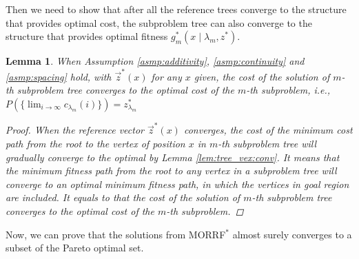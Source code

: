 \documentclass[conference]{IEEEtran}
\newtheorem{lem}{Lemma}
\begin{document}
Then we need to show that after all the reference trees converge to the structure that provides optimal cost, 
the subproblem tree can also converge to the structure that provides optimal fitness $ g^{*}_{m} ( x \mid \lambda_{m} , z^{*} ) $.
\begin{lem}
\label{lem:sub_tree:conv}
When Assumption \ref{asmp:additivity}, \ref{asmp:continuity} and \ref{asmp:spacing} hold,
with $ \vec{z}^{*} (x) $ for any $ x $ given,
the cost of the solution of $ m $-th subproblem tree converges to the optimal cost of the $ m $-th subproblem, i.e.,
$
P( \{ \lim_{ i \rightarrow \infty } c_{ \lambda_{m} }( i ) \} ) = z^{*}_{ \lambda_{m} }
$
\begin{proof}
When the reference vector $ \vec{z}^{*}(x) $ converges, the cost of the minimum cost path from the root to the vertex of position $ x $ in $ m $-th subproblem tree will gradually converge to the optimal by Lemma \ref{lem:tree_vex:conv}.
It means that the minimum fitness path from the root to any vertex in a subproblem tree will converge to an optimal minimum fitness path, in which the vertices in goal region are included.
It equals to that the cost of the solution of $ m $-th subproblem tree converges to the optimal cost of the $ m $-th subproblem.
\end{proof}
\end{lem}

Now, we can prove that the solutions from MORRF$^{*}$ almost surely converges to a subset of the Pareto optimal set.
\end{document}
